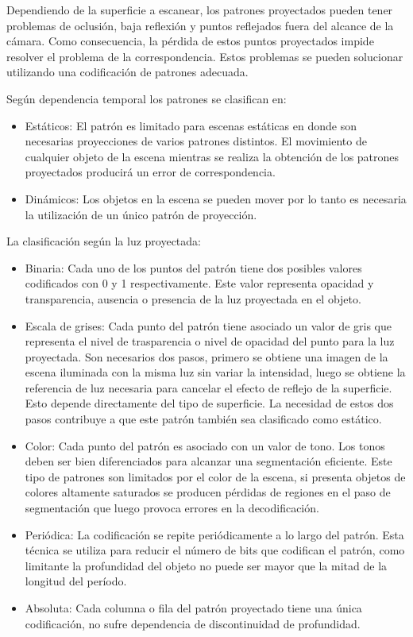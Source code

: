 Dependiendo de la superficie a escanear, los patrones proyectados pueden tener problemas de oclusión, baja reflexión y puntos reflejados fuera del alcance de la cámara. Como consecuencia, la pérdida de estos puntos proyectados impide resolver el problema de la correspondencia.
Estos problemas se pueden solucionar utilizando una codificación de patrones adecuada\cite{SLightCorrespondence}.

Según dependencia temporal los patrones se clasifican en:
\begin{itemize}
	\item Estáticos: El patrón es limitado para escenas estáticas en donde son necesarias proyecciones de varios patrones distintos. El movimiento de cualquier objeto de la escena mientras se realiza la obtención de los patrones proyectados producirá un error de correspondencia.
	\item Dinámicos: Los objetos en la escena se pueden mover por lo tanto es necesaria la utilización de un único patrón de proyección.
\end{itemize}

La clasificación según la luz proyectada:
\begin{itemize}
	\item Binaria: Cada uno de los puntos del patrón tiene dos posibles valores codificados con 0 y 1 respectivamente. Este valor representa opacidad y transparencia, ausencia o presencia de la luz proyectada en el objeto.
	\item Escala de grises: Cada punto del patrón tiene asociado un valor de gris que representa el nivel de trasparencia o nivel de opacidad del punto para la luz proyectada. Son necesarios dos pasos, primero se obtiene una imagen de la escena iluminada con la misma luz sin variar la intensidad, luego se obtiene la referencia de luz necesaria para cancelar el efecto de reflejo de la superficie. Esto depende directamente del tipo de superficie. La necesidad de estos dos pasos contribuye a que este patrón también sea clasificado como estático.
	\item Color: Cada punto del patrón es asociado con un valor de tono. Los tonos deben ser bien diferenciados para alcanzar una segmentación eficiente. Este tipo de patrones son limitados por el color de la escena, si presenta objetos de colores altamente saturados se producen pérdidas de regiones en el paso de segmentación que luego provoca errores en la decodificación.
\end{itemize}

\begin{itemize}
Otra posible clasificación es según la discontinuidad en la profundidad de la superficie proyectada:
	\item Periódica: La codificación se repite periódicamente a lo largo del patrón. Esta  técnica se utiliza para reducir el número de bits que codifican el patrón, como limitante la profundidad del objeto no puede ser mayor que la mitad de la longitud del período.
	\item Absoluta: Cada columna o fila del patrón proyectado tiene una única codificación, no sufre dependencia de discontinuidad de profundidad.
\end{itemize}

